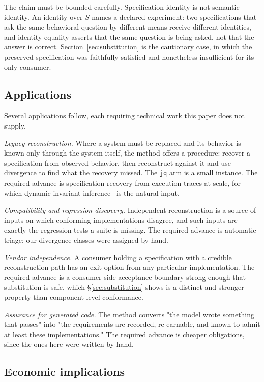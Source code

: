 \documentclass[10pt,twocolumn]{article}
\begin{document}
The claim must be bounded carefully. Specification identity is not
semantic identity. An identity over $S$ names a declared experiment: two
specifications that ask the same behavioral question by different means
receive different identities, and identity equality asserts that the same
question is being asked, not that the answer is correct.
Section~\ref{sec:substitution} is the cautionary case, in which the
preserved specification was faithfully satisfied and nonetheless
insufficient for its only consumer.

\subsection{Applications}

Several applications follow, each requiring technical work this paper
does not supply.

\emph{Legacy reconstruction.} Where a system must be replaced and its
behavior is known only through the system itself, the method offers a
procedure: recover a specification from observed behavior, then
reconstruct against it and use divergence to find what the recovery
missed. The \texttt{jq} arm is a small instance. The required advance is
specification recovery from execution traces at scale, for which dynamic
invariant inference~\cite{ernst2007} is the natural input.

\emph{Compatibility and regression discovery.} Independent
reconstruction is a source of inputs on which conforming implementations
disagree, and such inputs are exactly the regression tests a suite is
missing. The required advance is automatic triage: our divergence
classes were assigned by hand.

\emph{Vendor independence.} A consumer holding a specification with a
credible reconstruction path has an exit option from any particular
implementation. The required advance is a consumer-side acceptance
boundary strong enough that substitution is safe, which
\S\ref{sec:substitution} shows is a distinct and stronger property than
component-level conformance.

\emph{Assurance for generated code.} The method converts "the model
wrote something that passes" into "the requirements are recorded,
re-earnable, and known to admit at least these implementations." The
required advance is cheaper obligations, since the ones here were written
by hand.

\subsection{Economic implications}
\end{document}
